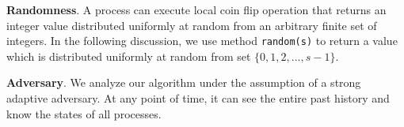 \textbf{Randomness}.
A process can execute local coin flip operation that returns an integer value distributed
uniformly at random from an arbitrary finite set of integers. In the following discussion, we use method
\texttt{random(s)} to return a value which is distributed uniformly at random from set $\{0, 1, 2,..., s-1\}$.



\textbf{Adversary}.
We analyze our algorithm under the assumption of a strong adaptive adversary. At any
point of time, it can see the entire past history and know the states of all processes.

